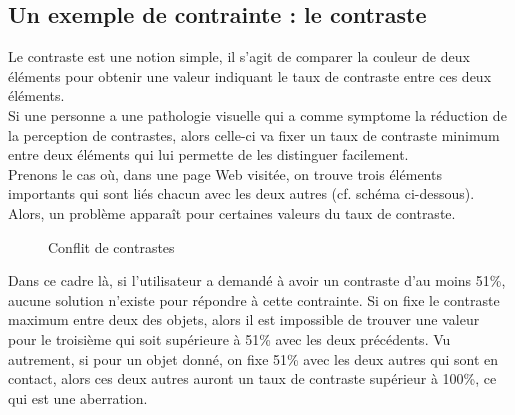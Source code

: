 \documentclass[french,a4paper]{report}
\begin{document}
{\subsection{Un exemple de contrainte : le contraste}
Le contraste est une notion simple, il s'agit de comparer la couleur de deux
éléments pour obtenir
une valeur indiquant le taux de contraste entre ces deux éléments.\\
Si une personne a une pathologie visuelle qui a comme \gls{symptome} la
réduction de la perception de contrastes, alors celle-ci va fixer un taux de
contraste minimum entre deux éléments qui lui
permette de les distinguer facilement.\\
Prenons le cas où, dans une page Web visitée, on trouve trois éléments
importants qui sont liés chacun avec les deux autres (cf. schéma ci-dessous).
Alors, un problème apparaît pour certaines valeurs du taux de contraste.\\
\begin{figure}[H]
\centering
{}
\caption{Conflit de contrastes}
\end{figure}
Dans ce cadre là, si l'utilisateur a demandé à avoir un contraste d'au moins
51\%, aucune solution n'existe pour répondre à cette contrainte. Si on fixe le
contraste maximum entre deux des objets, alors il est impossible de trouver une
valeur pour le troisième qui soit supérieure à 51\% avec
les deux précédents. Vu autrement, si pour un objet donné, on fixe
51\% avec les deux autres qui
sont en contact, alors ces deux autres auront un taux de contraste supérieur à
100\%, ce qui est une aberration.\\
\begin{figure}[H]
\centering
{}
\end{figure}}
\end{document}
